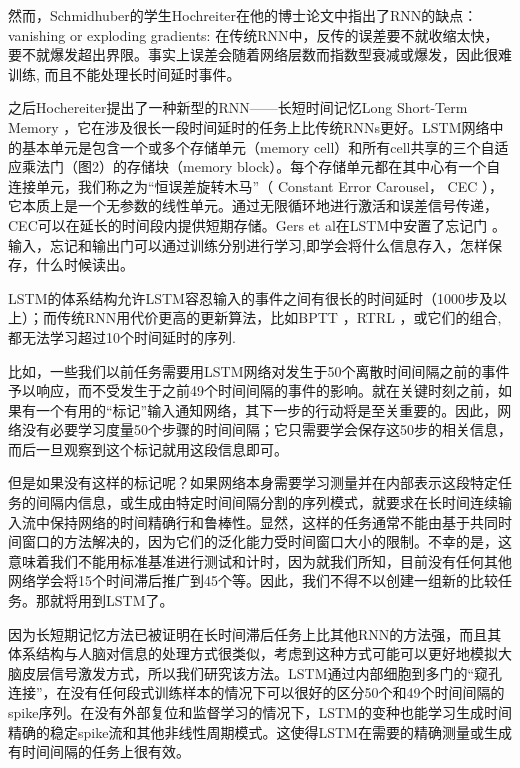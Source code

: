 然而，Schmidhuber的学生Hochreiter在他的博士论文\cite{hochreiter1991untersuchungen}中指出了RNN的缺点：vanishing or exploding gradients:
在传统RNN中，反传的误差要不就收缩太快，要不就爆发超出界限。事实上误差会随着网络层数而指数型衰减或爆发，因此很难训练, 而且不能处理长时间延时事件。

之后Hochereiter提出了一种新型的RNN——长短时间记忆Long Short-Term Memory \cite{hochreiter1997long}，它在涉及很长一段时间延时的任务上比传统RNNs更好。LSTM网络中的基本单元是包含一个或多个存储单元（memory cell）和所有cell共享的三个自适应乘法门（图2）的存储块（memory block）。每个存储单元都在其中心有一个自连接单元，我们称之为“恒误差旋转木马”（ Constant Error Carousel， CEC ），它本质上是一个无参数的线性单元。通过无限循环地进行激活和误差信号传递，CEC可以在延长的时间段内提供短期存储。Gers et al在LSTM中安置了忘记门 \cite{gers2000learning}。输入，忘记和输出门可以通过训练分别进行学习,即学会将什么信息存入，怎样保存，什么时候读出。

 

LSTM的体系结构允许LSTM容忍输入的事件之间有很长的时间延时（1000步及以上）；而传统RNN用代价更高的更新算法，比如BPTT \cite{williams1990efficient}，RTRL \cite{robinson1987utility,williams1989learning}，或它们的组合\cite{schmidhuber1992fixed,williams1995gradient},都无法学习超过10个时间延时的序列\cite{hochreiter1991untersuchungen,bengio1994learning,hochreiter1997long, gers2000learning,hochreiter2001gradient}.

比如，一些我们以前任务需要用LSTM网络对发生于50个离散时间间隔之前的事件予以响应，而不受发生于之前49个时间间隔的事件的影响。就在关键时刻之前，如果有一个有用的“标记”输入通知网络，其下一步的行动将是至关重要的。因此，网络没有必要学习度量50个步骤的时间间隔；它只需要学会保存这50步的相关信息，而后一旦观察到这个标记就用这段信息即可。

但是如果没有这样的标记呢？如果网络本身需要学习测量并在内部表示这段特定任务的间隔内信息，或生成由特定时间间隔分割的序列模式，就要求在长时间连续输入流中保持网络的时间精确行和鲁棒性。显然，这样的任务通常不能由基于共同时间窗口的方法解决的，因为它们的泛化能力受时间窗口大小的限制。不幸的是，这意味着我们不能用标准基准进行测试和计时，因为就我们所知，目前没有任何其他网络学会将15个时间滞后推广到45个等。因此，我们不得不以创建一组新的比较任务。那就将用到LSTM了。

因为长短期记忆方法已被证明在长时间滞后任务上比其他RNN的方法强，而且其体系结构与人脑对信息的处理方式很类似，考虑到这种方式可能可以更好地模拟大脑皮层信号激发方式，所以我们研究该方法。LSTM通过内部细胞到多门的“窥孔连接”，在没有任何段式训练样本的情况下可以很好的区分50个和49个时间间隔的spike序列。在没有外部复位和监督学习的情况下，LSTM的变种也能学习生成时间精确的稳定spike流和其他非线性周期模式。这使得LSTM在需要的精确测量或生成有时间间隔的任务上很有效。






